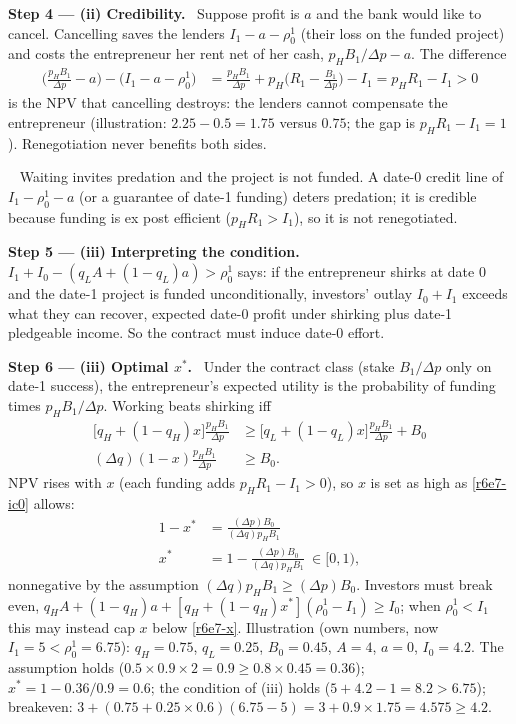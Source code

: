 \documentclass[11pt,a4paper]{article}
\newcommand{\step}[2]{\par\medskip\noindent\textbf{Step #1 --- #2.}~}
\newcommand{\answer}[1]{\par\smallskip\noindent\fbox{\textbf{Answer #1.}}~}
\begin{document}
\step{4}{(ii) Credibility} Suppose profit is $a$ and the bank would like to cancel. Cancelling saves the lenders $I_1-a-\rho_0^1$ (their loss on the funded project) and costs the entrepreneur her rent net of her cash, $p_HB_1/\Delta p-a$. The difference
\begin{align}
  \Big(\frac{p_HB_1}{\Delta p}-a\Big)-\big(I_1-a-\rho_0^1\big) &= \frac{p_HB_1}{\Delta p}+p_H\Big(R_1-\frac{B_1}{\Delta p}\Big)-I_1 = p_HR_1-I_1>0 \nonumber
\end{align}
is the NPV that cancelling destroys: the lenders cannot compensate the entrepreneur (illustration: $2.25-0.5=1.75$ versus $0.75$; the gap is $p_HR_1-I_1=1$). Renegotiation never benefits both sides.

\answer{(ii)} Waiting invites predation and the project is not funded. A date-0 credit line of $I_1-\rho_0^1-a$ (or a guarantee of date-1 funding) deters predation; it is credible because funding is ex post efficient ($p_HR_1>I_1$), so it is not renegotiated.

\step{5}{(iii) Interpreting the condition} $I_1+I_0-(q_LA+(1-q_L)a)>\rho_0^1$ says: if the entrepreneur shirks at date 0 and the date-1 project is funded unconditionally, investors' outlay $I_0+I_1$ exceeds what they can recover, expected date-0 profit under shirking plus date-1 pledgeable income. So the contract must induce date-0 effort.

\step{6}{(iii) Optimal $x^*$} Under the contract class (stake $B_1/\Delta p$ only on date-1 success), the entrepreneur's expected utility is the probability of funding times $p_HB_1/\Delta p$. Working beats shirking iff
\begin{align}
  \big[q_H+(1-q_H)x\big]\frac{p_HB_1}{\Delta p} &\ge \big[q_L+(1-q_L)x\big]\frac{p_HB_1}{\Delta p}+B_0 \nonumber\\
  (\Delta q)(1-x)\frac{p_HB_1}{\Delta p} &\ge B_0. \label{r6e7-ic0}
\end{align}
NPV rises with $x$ (each funding adds $p_HR_1-I_1>0$), so $x$ is set as high as \eqref{r6e7-ic0} allows:
\begin{align}
  1-x^* &= \frac{(\Delta p)B_0}{(\Delta q)p_HB_1} \nonumber\\
  x^* &= 1-\frac{(\Delta p)B_0}{(\Delta q)p_HB_1}\ \in[0,1), \label{r6e7-x}
\end{align}
nonnegative by the assumption $(\Delta q)p_HB_1\ge(\Delta p)B_0$. Investors must break even,
$q_HA+(1-q_H)a+[q_H+(1-q_H)x^*](\rho_0^1-I_1)\ge I_0$; when $\rho_0^1<I_1$ this may instead cap $x$ below \eqref{r6e7-x}.
Illustration (own numbers, now $I_1=5<\rho_0^1=6.75$): $q_H=0.75$, $q_L=0.25$, $B_0=0.45$, $A=4$, $a=0$, $I_0=4.2$. The assumption holds ($0.5\times0.9\times2=0.9\ge0.8\times0.45=0.36$); $x^*=1-0.36/0.9=0.6$; the condition of (iii) holds ($5+4.2-1=8.2>6.75$); breakeven: $3+(0.75+0.25\times0.6)(6.75-5)=3+0.9\times1.75=4.575\ge4.2$.
\end{document}
